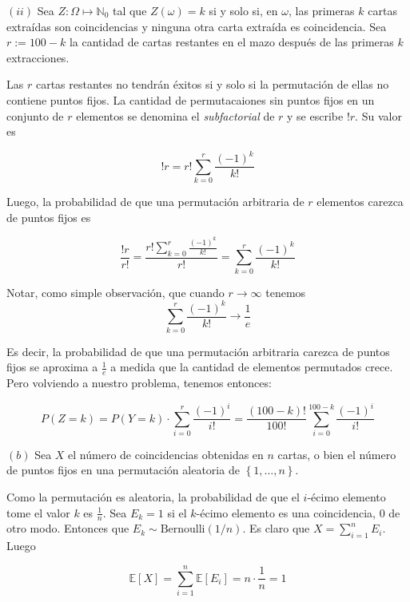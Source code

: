 \documentclass[a4paper, 12pt]{article}
\begin{document}
$(ii)$ Sea $Z : \Omega \mapsto \mathbb{N}_0$ tal que $Z(\omega) = k$ si y solo si,
en $\omega$, las primeras $k$ cartas extraídas son coincidencias y ninguna otra
carta extraída es coincidencia.  Sea $r := 100 - k$ la cantidad de cartas
restantes en el mazo después de las primeras $k$ extracciones.

Las $r$ cartas restantes no tendrán éxitos si y solo si la permutación de ellas
no contiene puntos fijos. La cantidad de permutacaiones sin puntos fijos en un
conjunto de $r$ elementos se denomina el \textit{subfactorial} de $r$ y se
escribe $!r$. Su valor es 

\begin{equation*}
  !r = r! \sum_{k=0}^r \frac{(-1)^k}{k!}
\end{equation*}

Luego, la probabilidad de que una permutación arbitraria de $r$ elementos
carezca de puntos fijos es 

\begin{equation*}
  \frac{!r}{r!} = \frac{r! \sum_{k=0}^r \frac{(-1)^k}{k!}}{r!} = \sum_{k=0}^r
  \frac{(-1)^k}{k!}
\end{equation*}

Notar, como simple observación, que cuando $r \to \infty$ tenemos
$$\sum_{k=0}^r \frac{(-1)^k}{k!} \to \frac{1}{e}$$

Es decir, la probabilidad de que una permutación arbitraria carezca de puntos
fijos se aproxima a $\frac{1}{e}$ a medida que la cantidad de elementos
permutados crece. Pero volviendo a nuestro problema, tenemos entonces:

\begin{equation*}
  P(Z = k) = P(Y = k) \cdot \sum_{i=0}^r \frac{(-1)^i}{i!} =
  \frac{(100-k)!}{100!} \sum_{i=0}^{100 - k} \frac{(-1)^i}{i!}
\end{equation*}

$(b)$ Sea $X$ el número de coincidencias obtenidas en $n$ cartas, o bien el
número de puntos fijos en una permutación aleatoria de $\left\{ 1,
\ldots, n \right\} $.

Como la permutación es aleatoria, la probabilidad de que el $i$-écimo elemento
tome el valor $k$ es $\frac{1}{n}$. Sea $E_k = 1$ si el $k$-écimo elemento es
una coincidencia, $0$ de otro modo. Entonces que $E_k \sim
\text{Bernoulli}( 1 / n)$. Es claro que $X = \sum_{i=1}^n E_i$. Luego 

\begin{equation*}
  \mathbb{E}\left[ X \right] = \sum_{i=1}^n \mathbb{E}\left[ E_i \right] =
  n \cdot \frac{1}{n} = 1
\end{equation*}
\end{document}
